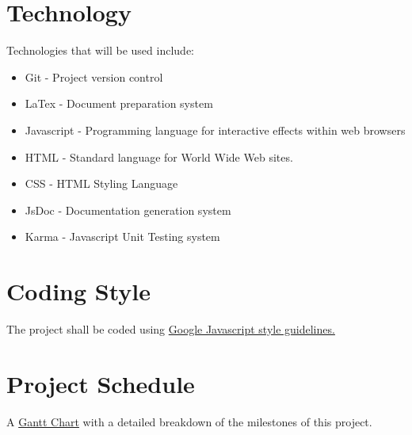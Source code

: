 \documentclass{article}
\begin{document}
\section{Technology}
Technologies that will be used include:

\begin{itemize}

  \item Git - Project version control
  \item LaTex - Document preparation system
  \item Javascript - Programming language for interactive effects within web browsers
  \item HTML - Standard language for World Wide Web sites.
  \item CSS - HTML Styling Language 
  \item JsDoc - Documentation generation system
  \item Karma - Javascript Unit Testing system 

\end{itemize}

\section{Coding Style}
The project shall be coded using \href{https://google.github.io/styleguide/javascriptguide.xml}
{Google Javascript style guidelines.}

\section{Project Schedule}

A \href{run:../../ProjectSchedule/Gantt Chart.gan}{Gantt Chart} with a detailed breakdown of the milestones of this project.
\end{document}
